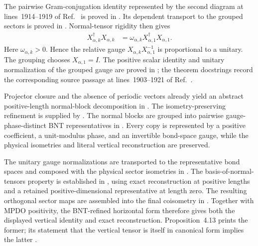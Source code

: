 \documentclass{article}
\begin{document}
The pairwise Gram-conjugation identity represented by the second diagram at
lines~1914--1919 of Ref.~\cite{Cirac2016MPDO_arXiv} is proved in
. Its dependent transport to
the grouped sectors is proved in
. Normal-tensor rigidity then
gives
\begin{align}
    X_{\alpha,k}^\dagger X_{\alpha,k}
     & =
    \omega_{\alpha,k}
    X_{\alpha,1}^\dagger X_{\alpha,1}.
    \label{eq:cpgsv17_vertical_diagonal_restriction_sector_gram_scaling}
\end{align}
Here $\omega_{\alpha,k}>0$. Hence the relative gauge
$X_{\alpha,k}X_{\alpha,1}^{-1}$ is proportional to a unitary. The grouping
chooses $X_{\alpha,1}=I$. The positive scalar identity and unitary
normalization of the grouped gauge are proved in
; the theorem docstrings
record the corresponding source passage at lines~1903--1921 of
Ref.~\cite{Cirac2016MPDO_arXiv}.

Projector closure and the absence of periodic vectors already yield an abstract
positive-length normal-block decomposition in
. The
isometry-preserving refinement is supplied by
. The normal blocks are grouped
into pairwise gauge-phase-distinct BNT representatives in
. Every copy is represented by a
positive coefficient, a unit-modulus phase, and an invertible bond-space gauge,
while the physical isometries and literal vertical reconstruction are
preserved.

The unitary gauge normalizations are transported to the representative bond
spaces and composed with the physical sector isometries in
. The
basis-of-normal-tensors property is established in
, using exact
reconstruction at positive lengths and a retained positive-dimensional
representative at length zero. The resulting orthogonal sector maps are
assembled into the final coisometry in
. Together with MPDO
positivity, the BNT-refined horizontal form therefore gives both
the displayed vertical identity and exact reconstruction. Proposition~4.13
prints the former; its statement that the vertical tensor is itself in
canonical form implies the latter
\cite[Proposition~4.13]{Cirac2016MPDO_arXiv}.
\end{document}

